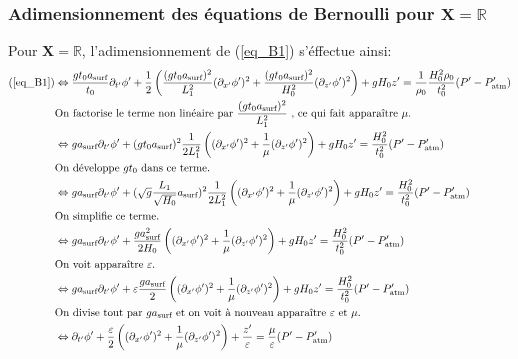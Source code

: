 \documentclass[12pt,a4paper]{article}
\numberwithin{equation}{section}
\begin{document}
\subsubsection{Adimensionnement des équations de Bernoulli pour $\textbf{X} = \mathbb{R}$}
Pour $\textbf{X} = \mathbb{R}$, l'adimensionnement de (\ref{eq_B1}) s'éffectue ainsi:
\begin{align}
    \text{(\ref{eq_B1})} &\Leftrightarrow \frac{g t_0 a_{\text{surf}}}{t_0}\partial_{t'} \phi' + \frac{1}{2}\left(\frac{(g t_0 a_{\text{surf}})^2}{L_1^2}(\partial_{x'}\phi')^2+ \frac{(g t_0 a_{\text{surf}})^2}{H_0^2}(\partial_{z'}\phi')^2\right) + g H_0 z' = \frac{1}{\rho_0}\frac{H_0^2\rho_0}{t_0^2}(P'-P'_{\text{atm}}) \nonumber\\
    &\text{On factorise le terme non linéaire par $ \frac{(g t_0 a_{\text{surf}})^2 }{L_1^2}$ , ce qui fait apparaître $\mu$.}\nonumber\\
     &\Leftrightarrow  g  a_{\text{surf}} \partial_{t'} \phi' + (g t_0 a_{\text{surf}})^2\frac{1}{2L_1^2}\left( (\partial_{x'}\phi')^2+ \frac{1}{\mu}(\partial_{z'}\phi')^2\right) + g H_0 z' =  \frac{H_0^2  }{t_0^2}(P'-P'_{\text{atm}})\nonumber\\
     &\text{On développe $gt_0$ dans ce terme.}\nonumber\\
     &\Leftrightarrow  g  a_{\text{surf}} \partial_{t'} \phi' + 
     ( \sqrt{g}\frac{L_1}{\sqrt{H_0}} a_{\text{surf}})^2
     \frac{1}{2L_1^2}
     \left( (\partial_{x'}\phi')^2+ \frac{1}{\mu}(\partial_{z'}\phi')^2\right) 
     + g H_0 z' 
     = \frac{H_0^2 }{t_0^2}(P'-P'_{\text{atm}})\nonumber\\
     &\text{On simplifie ce terme.}\nonumber\\
    &\Leftrightarrow  g  a_{\text{surf}} \partial_{t'} \phi' + 
     \frac{g a_{\text{surf}}^2}{2H_0}
     \left( (\partial_{x'}\phi')^2+ \frac{1}{\mu}(\partial_{z'}\phi')^2\right) 
     + g H_0 z' 
     = \frac{H_0^2  }{t_0^2}(P'-P'_{\text{atm}})\nonumber\\
     &\text{On voit apparaître $\varepsilon$.}\nonumber\\
     &\Leftrightarrow  g  a_{\text{surf}} \partial_{t'} \phi' + 
     \varepsilon\frac{g a_{\text{surf}}}{2}
     \left( (\partial_{x'}\phi')^2+ \frac{1}{\mu}(\partial_{z'}\phi')^2\right) 
     + g H_0 z' 
     = \frac{H_0^2 }{t_0^2}(P'-P'_{\text{atm}})\nonumber\\
     &\text{On divise tout par $g  a_{\text{surf}}$ et on voit à nouveau apparaître $\varepsilon$ et $\mu$}. \nonumber\\
     &\Leftrightarrow   \partial_{t'} \phi' + 
     \frac{\varepsilon}{2}
     \left( (\partial_{x'}\phi')^2+ \frac{1}{\mu}(\partial_{z'}\phi')^2\right) 
     + \frac{z'}{\varepsilon} 
     = \frac{\mu}{\varepsilon}(P'-P'_{\text{atm}}) \label{eq_B1_adim}
\end{align}
\\
\end{document}

